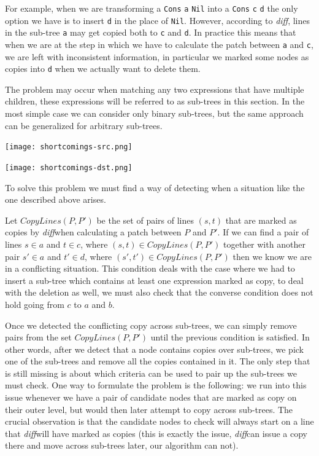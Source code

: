 \documentclass[11pt, titlepage]{article}
\newcommand{\toHaskell}[1]{\texttt{#1}\xspace}
\newcommand{\diff}{\emph{diff}}
\begin{document}
For example, when we are transforming a \toHaskell{Cons} \toHaskell{a} \toHaskell{Nil} into a \toHaskell{Cons} \toHaskell{c} \toHaskell{d} the only option we have is to insert \toHaskell{d} in the place of \toHaskell{Nil}. 
However, according to \diff, lines in the sub-tree \toHaskell{a} may get copied both to \toHaskell{c} and \toHaskell{d}. In practice this means that when we are at the step in which we have to calculate the patch between \toHaskell{a} and \toHaskell{c}, we are left with inconsistent information, in particular we marked some nodes as copies into \toHaskell{d} when we actually want to delete them.


The problem may occur when matching any two expressions that have multiple children, these expressions will be referred to as sub-trees in this section. In the most simple case we can consider only binary sub-trees, but the same approach can be generalized for arbitrary sub-trees.

\vspace{.6em}
\begin{minipage}{0.4\linewidth}
\centering
\texttt{[image: shortcomings-src.png]}
\end{minipage}
\begin{minipage}{0.4\linewidth}
\centering
\texttt{[image: shortcomings-dst.png]}
\end{minipage}
\vspace{.6em}

To solve this problem we must find a way of detecting when a situation like the one described above arises. 

Let $CopyLines(P,P')$ be the set of pairs of lines $(s,t)$ that are marked as copies by \diff when calculating a patch between $P$ and $P'$.
If we can find a pair of lines $s \in a$ and $t \in c$, where $(s,t) \in CopyLines(P,P')$ together with another pair $s' \in a$ and $t' \in d$, where $(s',t') \in CopyLines(P,P')$ then we know we are in a conflicting situation. 
This condition deals with the case where we had to insert a sub-tree which contains at least one expression marked as copy, to deal with the deletion as well, we must also check that the converse condition does not hold going from $c$ to $a$ and $b$.

Once we detected the conflicting copy across sub-trees, we can simply remove pairs from the set $CopyLines(P,P')$ until the previous condition is satisfied. In other words, after we detect that a node contains copies over sub-trees, we pick one of the sub-trees and remove all the copies contained in it.
The only step that is still missing is about which criteria can be used to pair up the sub-trees we must check. 
One way to formulate the problem is the following: we run into this issue whenever we have a pair of candidate nodes that are marked as copy on their outer level, but would then later attempt to copy across sub-trees.  
The crucial observation is that the candidate nodes to check will always start on a line that \diff will have marked as copies (this is exactly the issue, \diff can issue a copy there and move across sub-trees later, our algorithm can not). 
\end{document}
